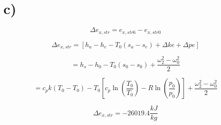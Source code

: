 

\section*{c)}

\[
\Delta e_{x,str} = e_{x,str6} - e_{x,str0}
\]

\[
\Delta e_{x,str} = \left[ h_a - h_e - T_0(s_a - s_e) + \Delta ke + \Delta pe \right]
\]

\[
= h_s - h_0 - T_0(s_0 - s_0) + \frac{\omega_2^2 - \omega_0^2}{2}
\]

\[
= c_p k(T_0 - T_0) - T_0 \left[ c_p \ln \left( \frac{T_0}{T_0} \right) - R \ln \left( \frac{p_0}{p_0} \right) \right] + \frac{\omega_2^2 - \omega_0^2}{2}
\]

\[
\Delta e_{x,str} = -26019.4 \frac{kJ}{kg}
\]